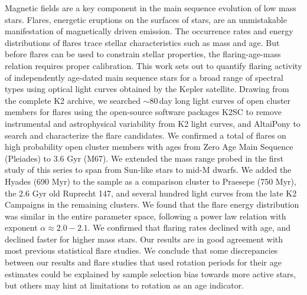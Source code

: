 \documentclass{aa}
\begin{document}
  \abstract
   {Magnetic fields are a key component in the main sequence evolution of low mass stars. Flares, energetic eruptions on the surfaces of stars, are an unmistakable manifestation of magnetically driven emission. The occurrence rates and energy distributions of flares trace stellar characteristics such as mass and age. But before flares can be used to constrain stellar properties, the flaring-age-mass relation requires proper calibration.}
   {This work sets out to quantify flaring activity of independently age-dated main sequence stars for a broad range of spectral types using optical light curves obtained by the Kepler satellite.}
   {Drawing from the complete K2 archive, we searched \unskip\;$\sim80$\,day long light curves of open cluster members for flares using the open-source software packages K2SC to remove instrumental and astrophysical variability from K2 light curves, and AltaiPony to search and characterize the flare candidates.}
   {We confirmed a total of flares on high probability open cluster members with ages from Zero Age Main Sequence (Pleiades) to 3.6 Gyr (M67). We extended the mass range probed in the first study of this series to span from Sun-like stars to mid-M dwarfs. We added the Hyades (690 Myr) to the sample as a comparison cluster to Praesepe (750 Myr), the 2.6 Gyr old Ruprecht 147, and several hundred light curves from the late K2 Campaigns in the remaining clusters. We found that the flare energy distribution was similar in the entire parameter space, following a power law relation with exponent $\alpha\approx 2.0-2.1$. }
{We confirmed that flaring rates declined with age, and declined faster for higher mass stars. Our results are in good agreement with most previous statistical flare studies. We conclude that some discrepancies between our results and flare studies that used rotation periods for their age estimates could be explained by sample selection bias towards more active stars, but others may hint at limitations to rotation as an age indicator.}
   \maketitle
   
\end{document}
